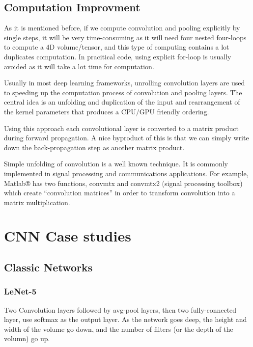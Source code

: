 \documentclass{article}
\begin{document}
	\subsection{Computation Improvment}
	\begin{flushleft}
		As it is mentioned before, if we compute convolution and pooling explicitly by single steps, it will be very time-consuming as it will need four nested four-loops to compute a 4D volume/tensor, and this type of computing contains a lot duplicates computation. In pracitical code, using explicit for-loop is usually avoided as it will take a lot time for computation.
	\end{flushleft}
	\begin{flushleft}
		Usually in most deep learning frameworks, unrolling convolution layers are used to speeding up the computation process of convolution and pooling layers. The central idea is an unfolding and duplication of the input and rearrangement of the kernel parameters that produces a CPU/GPU friendly ordering.
	\end{flushleft}
	\begin{flushleft}
		Using this approach each convolutional layer is converted to a matrix product during forward propagation. A nice byproduct of this is that we can simply write down the back-propagation step as another matrix product. 
	\end{flushleft}
	\begin{flushleft}
		Simple unfolding of convolution is a well known technique. It is commonly implemented in signal processing and communications applications. For example, Matlab® has two functions, convmtx and convmtx2 (signal processing toolbox) which create “convolution matrices” in order to transform convolution into a matrix multiplication.
	\end{flushleft}
	\section{CNN Case studies}
	\subsection{Classic Networks}
	\subsubsection{LeNet-5}
	Two Convolution layers followed by avg-pool layers, then two fully-connected layer, use softmax as the output layer. As the network goes deep,
	the height and width of the volume go down, and the number of filters (or the depth of the volumn) go up.
\end{document}
